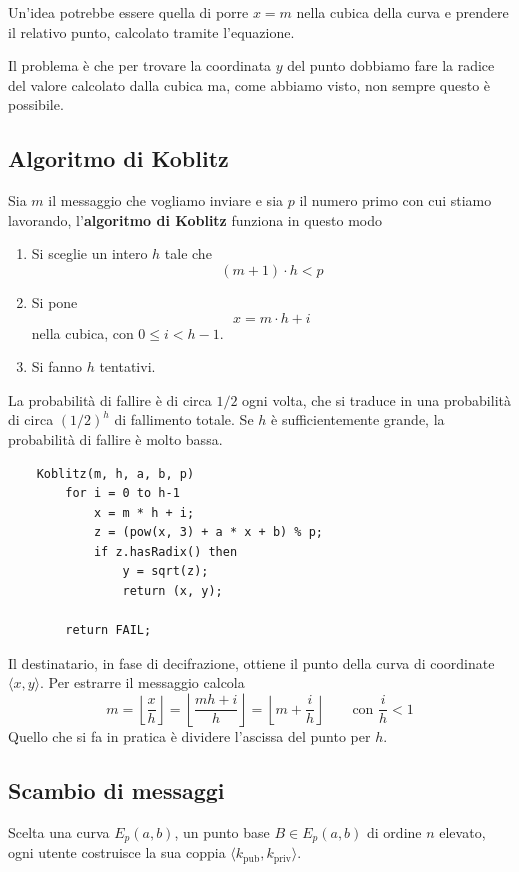 Un'idea potrebbe essere quella di porre $x = m$ nella cubica della curva e prendere il relativo punto, calcolato
tramite l'equazione.

Il problema \`e che per trovare la coordinata $y$ del punto dobbiamo fare la radice del valore calcolato dalla
cubica ma, come abbiamo visto, non sempre questo \`e possibile.

\subsection{Algoritmo di Koblitz}
Sia $m$ il messaggio che vogliamo inviare e sia $p$ il numero primo con cui stiamo lavorando, l'\textbf{algoritmo
	di Koblitz} funziona in questo modo
\begin{enumerate}
	\item Si sceglie un intero $h$ tale che
	      \[ (m + 1) \cdot h < p \]
	\item Si pone
	      \[ x = m \cdot h + i \]
	      nella cubica, con $0 \leq i < h-1$.
	\item Si fanno $h$ tentativi.
\end{enumerate}
La probabilit\`a di fallire \`e di circa $1/2$ ogni volta, che si traduce in una
probabilit\`a di circa $(1/2)^h$ di fallimento totale. Se $h$ \`e
sufficientemente grande, la probabilit\`a di fallire \`e molto bassa.
\begin{lstlisting}
	Koblitz(m, h, a, b, p)
		for i = 0 to h-1
			x = m * h + i;
			z = (pow(x, 3) + a * x + b) % p;
			if z.hasRadix() then 
				y = sqrt(z);
				return (x, y);

		return FAIL;
\end{lstlisting}
Il destinatario, in fase di decifrazione, ottiene il punto della curva di coordinate $\langle x, y \rangle$. Per
estrarre il messaggio calcola
\[
	m = \left\lfloor \frac{x}{h} \right\rfloor  =
	\left\lfloor \frac{mh + i}{h} \right\rfloor =
	\left\lfloor m + \frac{i}{h} \right\rfloor
	\quad \quad \text{con } \frac{i}{h} < 1
\]
Quello che si fa in pratica \`e dividere l'ascissa del punto per $h$.

\subsection{Scambio di messaggi}
Scelta una curva $E_p(a, b)$, un punto base $B \in E_p(a, b)$ di ordine $n$ elevato, ogni utente costruisce la sua
coppia $\langle k_\text{pub}, k_\text{priv} \rangle$.

